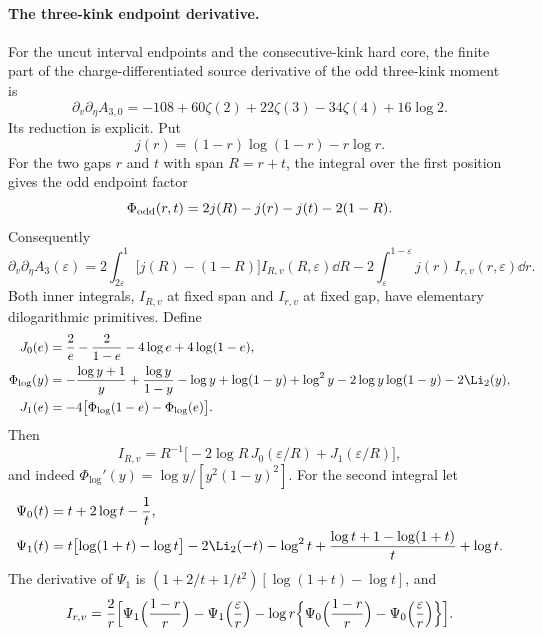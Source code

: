\paragraph{The three-kink endpoint derivative.} For the uncut interval endpoints and the consecutive-kink hard core,
the finite part of the charge-differentiated source derivative of the odd three-kink moment is
\begin{equation}
 \partial_v\partial_\eta A_{3,0}=-108+60\zeta(2)+22\zeta(3)-34\zeta(4)+16\log2.
 \label{sri:eq:dualB:ep3}
\end{equation}
Its reduction is explicit. Put
\begin{equation}
 j(r)=(1-r)\log(1-r)-r\log r.
\end{equation}
For the two gaps $r$ and $t$ with span $R=r+t$, the integral over the first position gives the odd endpoint factor
\begin{equation}
 \Phi_{\rm odd}(r,t)=2j(R)-j(r)-j(t)-2(1-R).
\end{equation}
Consequently
\begin{equation}
 \partial_v\partial_\eta A_3(\varepsilon)=2\int_{2\varepsilon}^1\bigl[j(R)-(1-R)\bigr]I_{R,v}(R,\varepsilon)\dd R
 -2\int_\varepsilon^{1-\varepsilon}j(r)\,I_{r,v}(r,\varepsilon)\dd r.
 \label{sri:eq:dualB:ep3reduce}
\end{equation}
Both inner integrals, $I_{R,v}$ at fixed span and $I_{r,v}$ at fixed gap, have elementary dilogarithmic primitives.
Define
\begin{equation}
\begin{aligned}
 J_0(e)&=\frac2e-\frac2{1-e}-4\log e+4\log(1-e),\\
 \Phi_{\log}(y)&=-\frac{\log y+1}{y}+\frac{\log y}{1-y}-\log y+\log(1-y)+\log^2y-2\log y\log(1-y)-2\Li_2(y),\\
 J_1(e)&=-4\bigl[\Phi_{\log}(1-e)-\Phi_{\log}(e)\bigr].
\end{aligned}
\end{equation}
Then
\begin{equation}
 I_{R,v}=R^{-1}\bigl[-2\log R\,J_0(\varepsilon/R)+J_1(\varepsilon/R)\bigr],
\end{equation}
and indeed $\Phi_{\log}'(y)=\log y/[y^2(1-y)^2]$. For the second integral let
\begin{equation}
\begin{aligned}
 \Psi_0(t)&=t+2\log t-\frac1t,\\
 \Psi_1(t)&=t\bigl[\log(1+t)-\log t\bigr]-2\Li_2(-t)-\log^2t+\frac{\log t+1-\log(1+t)}{t}+\log t.
\end{aligned}
\end{equation}
The derivative of $\Psi_1$ is $(1+2/t+1/t^2)[\log(1+t)-\log t]$, and
\begin{equation}
 I_{r,v}=\frac2r\Bigl[\Psi_1\Bigl(\frac{1-r}{r}\Bigr)-\Psi_1\Bigl(\frac\varepsilon r\Bigr)
 -\log r\Bigl\{\Psi_0\Bigl(\frac{1-r}{r}\Bigr)-\Psi_0\Bigl(\frac\varepsilon r\Bigr)\Bigr\}\Bigr].
\end{equation}

